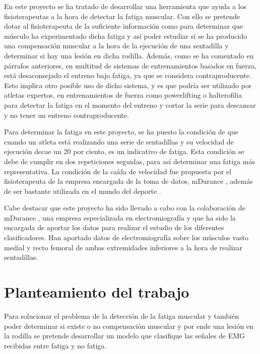 En este proyecto se ha tratado de desarrollar una herramienta que ayuda a los fisioterapeutas a la hora de detectar la fatiga muscular. Con ello se pretende dotar al fisioterapeuta de la suficiente información como para determinar que músculo ha experimentado dicha fatiga y así poder estudiar si se ha producido una compensación muscular a la hora de la ejecución de una sentadilla y determinar si hay una lesión en dicha rodilla. Además, como se ha comentado en párrafos anteriores, en multitud de sistemas de entrenamientos basados en fuerza, está desaconsejado el entreno bajo fatiga, ya que se considera contraproducente. Esto implica otro posible uso de dicho sistema, y es que podría ser utilizado por atletas expertos, en entrenamientos de fuerza como powerlifting o halterofilia para detectar la fatiga en el momento del entreno y cortar la serie para descansar y no tener un entreno contraproducente. 

Para determinar la fatiga en este proyecto, se ha puesto la condición de que cuando un atleta está realizando una serie de sentadillas y su velocidad de ejecución decae un 20 por ciento, es un indicativo de fatiga. Esta condición se debe de cumplir en dos repeticiones seguidas, para así determinar una fatiga más representativa. La condición de la caída de velocidad fue propuesta por el fisioterapeuta de la empresa encargada de la toma de datos, mDurance \cite{mDurance}, además de ser bastante utilizada en el mundo del deporte \cite{fernandezpropuesta}.

Cabe destacar que este proyecto ha sido llevado a cabo con la colaboración de mDurance \cite{mDurance}, una empresa especializada en electromiografía y que ha sido la encargada de aportar los datos para realizar el estudio de los diferentes clasificadores. Han aportado datos de electromiografía sobre los músculos vasto medial y recto femoral de ambas extremidades inferiores a la hora de realizar sentadillas.


\section{Planteamiento del trabajo}
Para solucionar el problema de la detección de la fatiga muscular y también poder determinar si existe o no compensación muscular y por ende una lesión en la rodilla se pretende desarrollar un modelo que clasifique las señales de EMG recibidas entre fatiga y no fatiga. 

